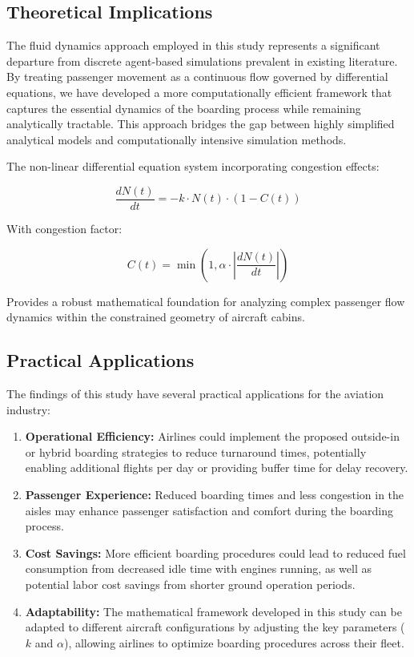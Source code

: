 \subsection{Theoretical Implications}

The fluid dynamics approach employed in this study represents a significant departure from discrete agent-based simulations prevalent in existing literature. By treating passenger movement as a continuous flow governed by differential equations, we have developed a more computationally efficient framework that captures the essential dynamics of the boarding process while remaining analytically tractable. This approach bridges the gap between highly simplified analytical models and computationally intensive simulation methods.

The non-linear differential equation system incorporating congestion effects:

\begin{equation}
    \frac{dN(t)}{dt} = -k \cdot N(t) \cdot (1 - C(t))
\end{equation}

With congestion factor:

\begin{equation}
    C(t) = \min\left(1, \alpha \cdot \left|\frac{dN(t)}{dt}\right|\right)
\end{equation}

Provides a robust mathematical foundation for analyzing complex passenger flow dynamics within the constrained geometry of aircraft cabins.

\subsection{Practical Applications}

The findings of this study have several practical applications for the aviation industry:

\begin{enumerate}
    \item \textbf{Operational Efficiency:} Airlines could implement the proposed outside-in or hybrid boarding strategies to reduce turnaround times, potentially enabling additional flights per day or providing buffer time for delay recovery.
    
    \item \textbf{Passenger Experience:} Reduced boarding times and less congestion in the aisles may enhance passenger satisfaction and comfort during the boarding process.
    
    \item \textbf{Cost Savings:} More efficient boarding procedures could lead to reduced fuel consumption from decreased idle time with engines running, as well as potential labor cost savings from shorter ground operation periods.
    
    \item \textbf{Adaptability:} The mathematical framework developed in this study can be adapted to different aircraft configurations by adjusting the key parameters ($k$ and $\alpha$), allowing airlines to optimize boarding procedures across their fleet.
\end{enumerate}

